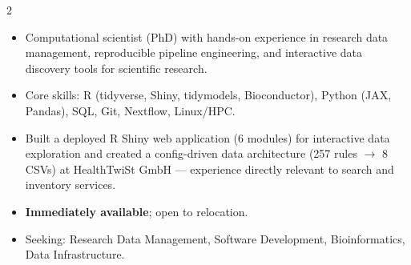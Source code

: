 \documentclass{thejus_cv}
\begin{document}
\begin{paracol}{2}


\begin{itemize}[label=\textbullet, leftmargin=1em]
    \item Computational scientist (PhD) with hands-on experience in research data management, reproducible pipeline engineering, and interactive data discovery tools for scientific research.
    \item Core skills: R (tidyverse, Shiny, tidymodels, Bioconductor), Python (JAX, Pandas), SQL, Git, Nextflow, Linux/HPC.
    \item Built a deployed R Shiny web application (6 modules) for interactive data exploration and created a config-driven data architecture (257 rules $\to$ 8 CSVs) at HealthTwiSt GmbH --- experience directly relevant to search and inventory services.
    \item \textbf{Immediately available}; open to relocation.
    \item Seeking: Research Data Management, Software Development, Bioinformatics, Data Infrastructure.
\end{itemize}



\end{paracol}
\end{document}
